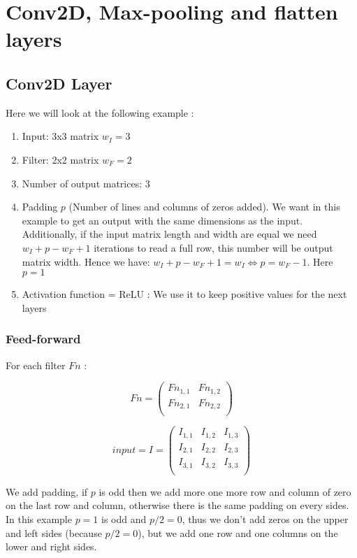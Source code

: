 \documentclass[11pt,a4paper]{report}
\begin{document}
\newpage
\section{Conv2D, Max-pooling and flatten layers}

\subsection{Conv2D Layer}
Here we will look at the following example :
\begin{enumerate}
    \item Input: 3x3 matrix $w_I = 3$
    \item Filter: 2x2 matrix $w_F = 2$
    \item Number of output matrices: 3
    \item Padding $p$ (Number of lines and columns of zeros added). We want in this example to get an output with the same dimensions as the input. Additionally, if the input matrix length and width are equal we need $w_I + p - w_F + 1$ iterations to read a full row, this number will be output matrix width. Hence we have: $w_I + p - w_F + 1 = w_I \Leftrightarrow p = w_F - 1$. Here $p = 1$
    \item Activation function = ReLU : We use it to keep positive values for the next layers
\end{enumerate}
\subsubsection{Feed-forward}

For each filter $Fn$ :

\begin{equation}
Fn = \begin{pmatrix}
Fn_{1,1} & Fn_{1,2} \\
Fn_{2,1} & Fn_{2,2} \\
\end{pmatrix}
\end{equation}

\begin{equation}
input = I = \begin{pmatrix}
I_{1,1} & I_{1,2} & I_{1,3} \\
I_{2,1} & I_{2,2} & I_{2,3} \\
I_{3,1} & I_{3,2} & I_{3,3} \\
\end{pmatrix}
\end{equation}

We add padding, if $p$ is odd then we add more one more row and column of zero on the last row and column, otherwise there is the same padding on every sides. In this example $p = 1$ is odd and $p/2 = 0$, thus we don't add zeros on the upper and left sides (because $p/2 = 0$), but we add one row and one columns on the lower and right sides.
\end{document}
